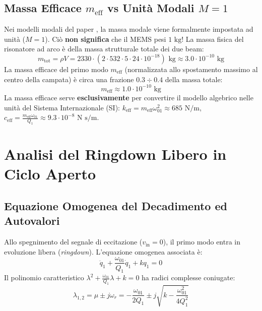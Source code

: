 \documentclass[11pt,a4paper]{article}
\begin{document}
\subsection{Massa Efficace \texorpdfstring{$m_{\text{eff}}$}{meff} vs Unità Modali \texorpdfstring{$M=1$}{M=1}}
\begin{corrbox}
Nei modelli modali del paper \cite{Frangi2023}, la massa modale viene formalmente impostata ad unità ($M=1$). Ciò \textbf{non significa} che il MEMS pesi $1\text{ kg}$!
La massa fisica del risonatore ad arco è della massa strutturale totale dei due beam:
$$m_{\text{tot}} = \rho V = 2330 \cdot (2 \cdot 532 \cdot 5 \cdot 24 \cdot 10^{-18})\text{ kg} \approx 3.0 \cdot 10^{-10}\text{ kg}$$
La massa efficace del primo modo $m_{\text{eff}}$ (normalizzata allo spostamento massimo al centro della campata) è circa una frazione $0.3 \div 0.4$ della massa totale:
$$m_{\text{eff}} \approx 1.0 \cdot 10^{-10}\text{ kg}$$
La massa efficace serve \textbf{esclusivamente} per convertire il modello algebrico nelle unità del Sistema Internazionale (SI): $k_{\text{eff}} = m_{\text{eff}} \omega_{01}^2 \approx 685\text{ N/m}$, $c_{\text{eff}} = \frac{m_{\text{eff}} \omega_{01}}{Q_1} \approx 9.3 \cdot 10^{-8}\text{ N s/m}$.
\end{corrbox}

\newpage

\section{Analisi del Ringdown Libero in Ciclo Aperto}

\subsection{Equazione Omogenea del Decadimento ed Autovalori}
Allo spegnimento del segnale di eccitazione ($v_{\text{in}} = 0$), il primo modo entra in evoluzione libera (\emph{ringdown}). L'equazione omogenea associata è:
\begin{equation}
    \ddot{q}_1 + \frac{\omega_{01}}{Q_1} \dot{q}_1 + k q_1 = 0
\end{equation}
Il polinomio caratteristico $\lambda^2 + \frac{\omega_{01}}{Q_1} \lambda + k = 0$ ha radici complesse coniugate:
\begin{equation}
    \lambda_{1,2} = \mu \pm j \omega_r = -\frac{\omega_{01}}{2 Q_1} \pm j \sqrt{k - \frac{\omega_{01}^2}{4 Q_1^2}}
\end{equation}
\end{document}
